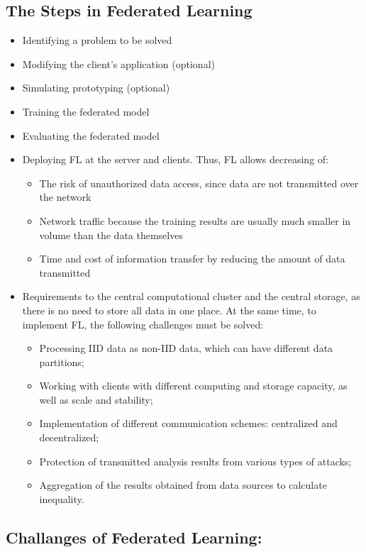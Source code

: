 \documentclass[14pt]{extarticle}
\begin{document}
\subsection{The Steps in Federated Learning}
\begin{itemize}
    \item Identifying a problem to be solved
    \item Modifying the client’s application (optional)
    \item Simulating prototyping (optional)
    \item Training the federated model
    \item Evaluating the federated model
    \item Deploying FL at the server and clients. Thus, FL allows decreasing of:
    \begin{itemize}
        \item The risk of unauthorized data access, since data are not transmitted over the network
        \item Network traffic because the training results are usually much smaller in volume than the data themselves
        \item Time and cost of information transfer by reducing the amount of data transmitted
    \end{itemize}
    \item Requirements to the central computational cluster and the central storage, as there is no need to store all data in one place. At the same time, to implement FL, the following challenges must be solved: 
    \begin{itemize}
        \item Processing IID data as non-IID data, which can have different data partitions; 
        \item Working with clients with different computing and storage capacity, as well as scale and   stability; 
        \item Implementation of different communication schemes: centralized and decentralized; 
        \item Protection of transmitted analysis results from various types of attacks; 
        \item Aggregation of the results obtained from data sources to calculate inequality.
    \end{itemize}
\end{itemize}

\newpage
\subsection{Challanges of Federated Learning:}
\end{document}
